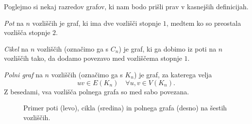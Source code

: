 \documentclass[12pt,a4paper]{amsart}
\theoremstyle{definition} %
\theoremstyle{plain} %
\newcommand{\N}{\mathbb N}
\newcommand{\vozlisca}[1][G]{\ensuremath{V(#1)}}
\newcommand{\povezave}[1][G]{\ensuremath{E(#1)}}
\begin{document}
Poglejmo si nekaj razredov grafov, ki nam bodo prišli prav v kasnejših definicijah. 

\emph{Pot} na $n$ vozliščih je graf, ki ima dve vozlišči stopnje $1$, medtem ko so preostala vozlišča stopnje $2$.

\emph{Cikel} na $n$ vozliščih (označimo ga s $C_n$) je graf, ki ga dobimo iz poti na $n$ vozliščih tako, da dodamo povezavo med vozliščema stopnje $1$.

\emph{Polni graf} na $n$ vozliščih (označimo ga s $K_n$) je graf, za katerega velja 
\[ uv \in \povezave[K_n] \quad \forall u,v \in \vozlisca[K_n].\] 
Z besedami, vsa vozlišča polnega grafa so med sabo povezana.

\begin{figure}[h]
    \caption{Primer poti (levo), cikla (sredina) in polnega grafa (desno) na šestih vozliščih.}
\end{figure}
\end{document}
